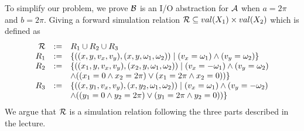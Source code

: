 \documentclass[11pt]{article}
\begin{document}
To simplify our problem, we prove ${\cal B}$ is an I/O abstraction for ${\cal A}$ when $a = 2\pi$ and $b = 2\pi$.
Giving a forward simulation relation ${\cal R} \subseteq val(X_1) \times val(X_2)$ which is defined as
\[
\begin{array}{rcl}
	 {\cal R} & := & R_1 \cup R_2 \cup R_3                                                                              \\
	R_1 & := & \{((x, y, v_x, v_y), (x, y, \omega_1, \omega_2)) \mid (v_x = \omega_1) \land (v_y = \omega_2)\}    \\
	R_2 & := & \{((x_1, y, v_x, v_y), (x_2, y, \omega_1, \omega_2)) \mid (v_x = -\omega_1) \land (v_y = \omega_2) \\
	    &    & \land ((x_1 = 0 \land x_2 = 2\pi) \lor (x_1 = 2\pi \land x_2 = 0))\}                               \\
	R_3 & := & \{((x, y_1, v_x, v_y), (x, y_2, \omega_1, \omega_2)) \mid (v_x = \omega_1) \land (v_y = -\omega_2) \\
	    &    & \land ((y_1 = 0 \land y_2 = 2\pi) \lor (y_1 = 2\pi \land y_2 = 0))\}
\end{array}
\]
We argue that ${\cal R}$ is a simulation relation following the three parts described in the lecture.
\end{document}

